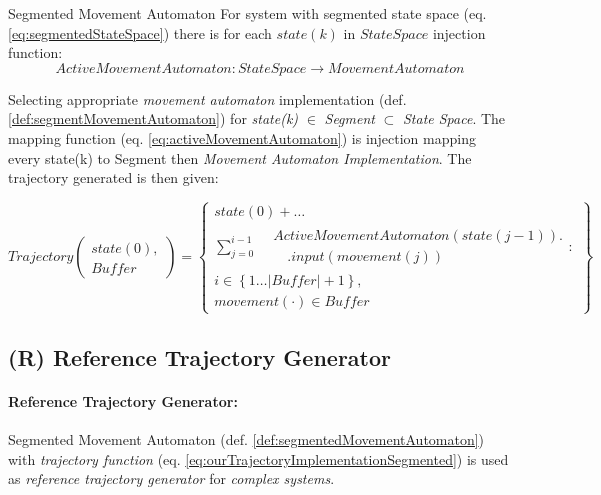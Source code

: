 \begin{definition}{Segmented Movement Automaton}\label{def:segmentedMovementAutomaton}
    For system with segmented state space (eq. \ref{eq:segmentedStateSpace}) there is for each $state(k)$ in $StateSpace$ injection function:
    \begin{equation} \label{eq:activeMovementAutomaton}
        ActiveMovementAutomaton:StateSpace\to MovementAutomaton
    \end{equation}
    
    Selecting appropriate \emph{movement automaton} implementation (def. \ref{def:segmentMovementAutomaton}) for \emph{state(k)} $\in$ \emph{Segment} $\subset$ \emph{State Space}. The mapping function (eq. \ref{eq:activeMovementAutomaton}) is injection mapping every state(k) to Segment then \emph{Movement Automaton Implementation}. The trajectory generated is then given:
    
    \begin{equation}\label{eq:ourTrajectoryImplementationSegmented}
        Trajectory\left(\begin{gathered}state(0),\\Buffer\end{gathered}\right)= 
        \left\{
            \begin{gathered}
                state(0)+\dots\\\sum_{j=0}^{i-1} 
                    \begin{aligned} 
                        &ActiveMovementAutomaton(state(j-1)).\\
                        &\quad.input(movement(j))
                    \end{aligned}:\\
                i \in\left\{1\dots |Buffer|+1\right\}, \\
                movement(\cdot) \in Buffer
            \end{gathered}
        \right\}
    \end{equation}
    
\end{definition}

\subsection{(R) Reference Trajectory Generator}\label{s:referenceTrajectoryGenerator}

\paragraph{Reference Trajectory Generator:} Segmented Movement Automaton (def.  \ref{def:segmentedMovementAutomaton}) with \emph{trajectory function} (eq. \ref{eq:ourTrajectoryImplementationSegmented}) is used as \emph{reference trajectory generator} for \emph{complex systems}. 

